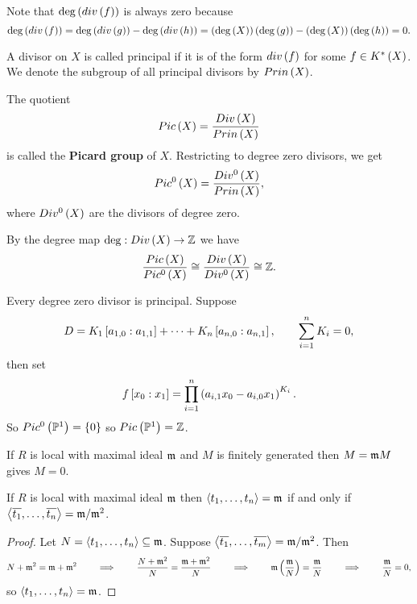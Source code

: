 \begin{remark}
Note that $ \deg\rb{div\rb{f}} $ is always zero because
$$ \deg\rb{div\rb{f}} = \deg\rb{div\rb{g}} - \deg\rb{div\rb{h}} = \rb{\deg\rb{X}}\rb{\deg\rb{g}} - \rb{\deg\rb{X}}\rb{\deg\rb{h}} = 0. $$
\end{remark}

\begin{definition}
A divisor on $ X $ is called principal if it is of the form $ div\rb{f} $ for some $ f \in K^*\rb{X} $. We denote the subgroup of all principal divisors by $ Prin\rb{X} $.
\end{definition}

\begin{definition}
The quotient
$$ Pic\rb{X} = \dfrac{Div\rb{X}}{Prin\rb{X}} $$
is called the \textbf{Picard group} of $ X $. Restricting to degree zero divisors, we get
$$ Pic^0\rb{X} = \dfrac{Div^0\rb{X}}{Prin\rb{X}}, $$
where $ Div^0\rb{X} $ are the divisors of degree zero.
\end{definition}

By the degree map $ \deg : Div\rb{X} \to \Z $ we have
$$ \dfrac{Pic\rb{X}}{Pic^0\rb{X}} \cong \dfrac{Div\rb{X}}{Div^0\rb{X}} \cong \Z. $$

\pagebreak

\begin{example}
Every degree zero divisor is principal. Suppose
$$ D = K_1\sb{a_{1, 0} : a_{1, 1}} + \dots + K_n\sb{a_{n, 0} : a_{n, 1}}, \qquad \sum_{i = 1}^n K_i = 0, $$
then set
$$ f\sb{x_0 : x_1} = \prod_{i = 1}^n \rb{a_{i, 1}x_0 - a_{i, 0}x_1}^{K_i}. $$
So $ Pic^0\rb{\P^1} = \cb{0} $ so $ Pic\rb{\P^1} = \Z $.
\end{example}


\begin{lemma}
If $ R $ is local with maximal ideal $ \mm $ and $ M $ is finitely generated then $ M = \mm M $ gives $ M = 0 $.
\end{lemma}

\begin{corollary}
If $ R $ is local with maximal ideal $ \mm $ then $ \ab{t_1, \dots, t_n} = \mm $ if and only if $ \ab{\overline{t_1}, \dots, \overline{t_n}} = \mm / \mm^2 $.
\end{corollary}

\begin{proof}
Let $ N = \ab{t_1, \dots, t_n} \subseteq \mm $. Suppose $ \ab{\overline{t_1}, \dots, \overline{t_m}} = \mm / \mm^2 $. Then
$$ N + \mm^2 = \mm + \mm^2 \qquad \implies \qquad \dfrac{N + \mm^2}{N} = \dfrac{\mm + \mm^2}{N} \qquad \implies \qquad \mm\rb{\dfrac{\mm}{N}} = \dfrac{\mm}{N} \qquad \implies \qquad \dfrac{\mm}{N} = 0, $$
so $ \ab{t_1, \dots, t_n} = \mm $.
\end{proof}

